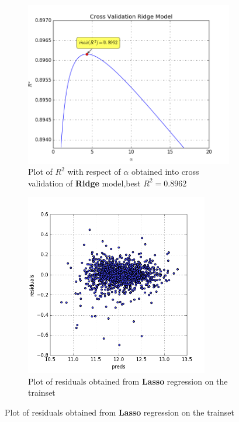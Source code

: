 \documentclass[a4paper, 11pt]{article}
\begin{document}
\begin{figure}
\centering
\begin{subfigure}[b]{10cm}            
\includegraphics[width=10cm]{r2ridge.png}
\caption{Plot of $R^2$ with respect of $\alpha$ obtained into cross validation of \textbf{Ridge} model,best $R^2 = 0.8962$}
\label{Fig:Data1}
\end{subfigure}
\begin{subfigure}[b]{8cm}
\centering
\includegraphics[width=8cm]{residuals.png}
\caption{Plot of residuals obtained from \textbf{Lasso} regression on the trainset}
\label{Fig:Data2}
\end{subfigure}
\label{fig:TOF}
\end{figure}
\end{document}
